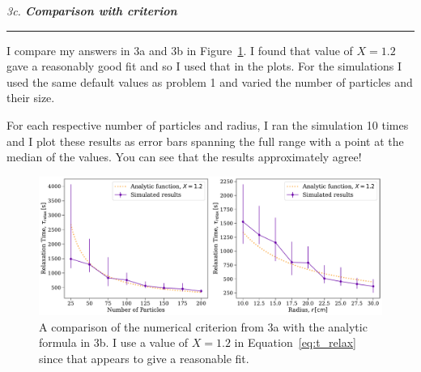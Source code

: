 \documentclass[12pt, letterpaper, twoside]{article}
\newcommand{\question}[1]{{\noindent \it #1}}
\newcommand{\answer}[1]{
    \par\noindent\rule{\textwidth}{0.4pt}#1\vspace{0.5cm}
}
\begin{document}
\question{3c. \textbf{Comparison with criterion}}
\answer{
    I compare my answers in 3a and 3b in Figure~\ref{fig:3c}. I found that value of $X = 1.2$ gave a reasonably good fit and so I used that in the plots. For the simulations I used the same default values as problem 1 and varied the number of particles and their size.
    
    For each respective number of particles and radius, I ran the simulation 10 times and I plot these results as error bars spanning the full range with a point at the median of the values. You can see that the results approximately agree!
    \begin{figure}
        \centering
        \includegraphics[width=\textwidth]{figures/3c.pdf}
        \caption{A comparison of the numerical criterion from 3a with the analytic formula in 3b. I use a value of $X = 1.2$ in Equation~\ref{eq:t_relax} since that appears to give a reasonable fit.}
        \label{fig:3c}
    \end{figure}
}
\end{document}
